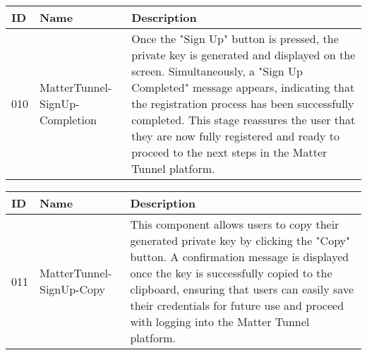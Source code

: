 \documentclass[conference]{IEEEtran}
\begin{document}
\begin{enumerate}[itemsep=2ex, parsep=1ex]
\begin{enumerate}[itemsep=2ex, parsep=1ex]
	      	      \begin{table}[h!]
	      	      	\def\arraystretch{1.24} \small
	      	      	\begin{tabular}{|p{1.2cm}|p{2.5cm}|p{4.0cm}|}
	      	      		\hline
	      	      		ID  & Name                           & Description                                                                                                                                                                                                                                                                                                                                                             \\
	      	      		\hline
	      	      		010 & MatterTunnel-SignUp-Completion & Once the "Sign Up" button is pressed, the private key is generated and displayed on the screen. Simultaneously, a "Sign Up Completed" message appears, indicating that the registration process has been successfully completed. This stage reassures the user that they are now fully registered and ready to proceed to the next steps in the Matter Tunnel platform. \\
	      	      		\hline
	      	      	\end{tabular}
	      	      \end{table}
	      	      
	      	      \begin{table}[h!]
	      	      	\def\arraystretch{1.24} \small
	      	      	\begin{tabular}{|p{1.2cm}|p{2.5cm}|p{4.0cm}|}
	      	      		\hline
	      	      		ID  & Name                     & Description                                                                                                                                                                                                                                                                                                             \\
	      	      		\hline
	      	      		011 & MatterTunnel-SignUp-Copy & This component allows users to copy their generated private key by clicking the "Copy" button. A confirmation message is displayed once the key is successfully copied to the clipboard, ensuring that users can easily save their credentials for future use and proceed with logging into the Matter Tunnel platform. \\
	      	      		\hline
	      	      	\end{tabular}
	      	      \end{table}
	      	      

\end{enumerate}
\end{enumerate}
\end{document}
